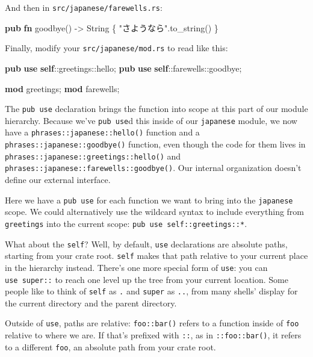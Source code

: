\documentclass[a4paper,]{book}
\newenvironment{Shaded}{\begin{snugshade}}{\end{snugshade}}
\newcommand{\KeywordTok}[1]{\textcolor[rgb]{0.13,0.29,0.53}{\textbf{{#1}}}}
\newcommand{\StringTok}[1]{\textcolor[rgb]{0.31,0.60,0.02}{{#1}}}
\newcommand{\NormalTok}[1]{{#1}}
\begin{document}
And then in \texttt{src/japanese/farewells.rs}:

\begin{Shaded}
\begin{Highlighting}[]
\KeywordTok{pub} \KeywordTok{fn} \NormalTok{goodbye() -> String \{}
    \StringTok{"さようなら"}\NormalTok{.to_string()}
\NormalTok{\}}
\end{Highlighting}
\end{Shaded}

Finally, modify your \texttt{src/japanese/mod.rs} to read like this:

\begin{Shaded}
\begin{Highlighting}[]
\KeywordTok{pub} \KeywordTok{use} \KeywordTok{self}\NormalTok{::greetings::hello;}
\KeywordTok{pub} \KeywordTok{use} \KeywordTok{self}\NormalTok{::farewells::goodbye;}

\KeywordTok{mod} \NormalTok{greetings;}
\KeywordTok{mod} \NormalTok{farewells;}
\end{Highlighting}
\end{Shaded}

The \texttt{pub\ use} declaration brings the function into scope at this
part of our module hierarchy. Because we've \texttt{pub\ use}d this
inside of our \texttt{japanese} module, we now have a
\texttt{phrases::japanese::hello()} function and a
\texttt{phrases::japanese::goodbye()} function, even though the code for
them lives in \texttt{phrases::japanese::greetings::hello()} and
\texttt{phrases::japanese::farewells::goodbye()}. Our internal
organization doesn't define our external interface.

Here we have a \texttt{pub\ use} for each function we want to bring into
the \texttt{japanese} scope. We could alternatively use the wildcard
syntax to include everything from \texttt{greetings} into the current
scope: \texttt{pub\ use\ self::greetings::*}.

What about the \texttt{self}? Well, by default, \texttt{use}
declarations are absolute paths, starting from your crate root.
\texttt{self} makes that path relative to your current place in the
hierarchy instead. There's one more special form of \texttt{use}: you
can \texttt{use\ super::} to reach one level up the tree from your
current location. Some people like to think of \texttt{self} as
\texttt{.} and \texttt{super} as \texttt{..}, from many shells' display
for the current directory and the parent directory.

Outside of \texttt{use}, paths are relative: \texttt{foo::bar()} refers
to a function inside of \texttt{foo} relative to where we are. If that's
prefixed with \texttt{::}, as in \texttt{::foo::bar()}, it refers to a
different \texttt{foo}, an absolute path from your crate root.
\end{document}
